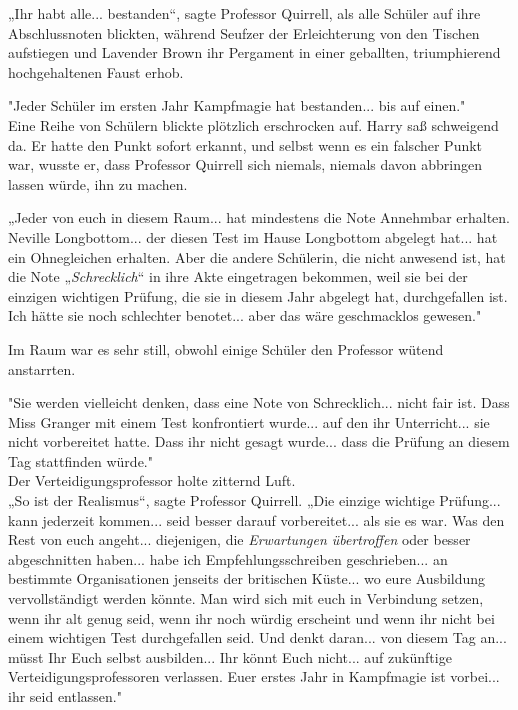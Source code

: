 {„Ihr habt alle... bestanden“, sagte Professor Quirrell, als alle Schüler auf ihre Abschlussnoten blickten, während Seufzer der Erleichterung von den Tischen aufstiegen und Lavender Brown ihr Pergament in einer geballten, triumphierend hochgehaltenen Faust erhob.

"Jeder Schüler im ersten Jahr Kampfmagie hat bestanden... bis auf einen."\\ Eine Reihe von Schülern blickte plötzlich erschrocken auf. Harry saß schweigend da. Er hatte den Punkt sofort erkannt, und selbst wenn es ein falscher Punkt war, wusste er, dass Professor Quirrell sich niemals, niemals davon abbringen lassen würde, ihn zu machen.

„Jeder von euch in diesem Raum... hat mindestens die Note Annehmbar erhalten. Neville Longbottom... der diesen Test im Hause Longbottom abgelegt hat... hat ein Ohnegleichen erhalten. Aber die andere Schülerin, die nicht anwesend ist, hat die Note „\emph{Schrecklich}“ in ihre Akte eingetragen bekommen, weil sie bei der einzigen wichtigen Prüfung, die sie in diesem Jahr abgelegt hat, durchgefallen ist. Ich hätte sie noch schlechter benotet... aber das wäre geschmacklos gewesen."

Im Raum war es sehr still, obwohl einige Schüler den Professor wütend anstarrten.

"Sie werden vielleicht denken, dass eine Note von Schrecklich... nicht fair ist. Dass Miss Granger mit einem Test konfrontiert wurde... auf den ihr Unterricht... sie nicht vorbereitet hatte. Dass ihr nicht gesagt wurde... dass die Prüfung an diesem Tag stattfinden würde."\\ Der Verteidigungsprofessor holte zitternd Luft.\\ „So ist der Realismus“, sagte Professor Quirrell. „Die einzige wichtige Prüfung... kann jederzeit kommen... seid besser darauf vorbereitet... als sie es war. Was den Rest von euch angeht... diejenigen, die \emph{Erwartungen übertroffen} oder besser abgeschnitten haben... habe ich Empfehlungsschreiben geschrieben... an bestimmte Organisationen jenseits der britischen Küste... wo eure Ausbildung vervollständigt werden könnte. Man wird sich mit euch in Verbindung setzen, wenn ihr alt genug seid, wenn ihr noch würdig erscheint und wenn ihr nicht bei einem wichtigen Test durchgefallen seid. Und denkt daran... von diesem Tag an... müsst Ihr Euch selbst ausbilden... Ihr könnt Euch nicht... auf zukünftige Verteidigungsprofessoren verlassen. Euer erstes Jahr in Kampfmagie ist vorbei... ihr seid entlassen."

}
